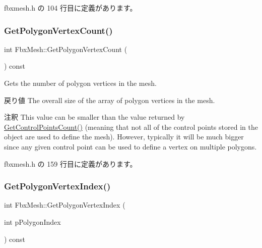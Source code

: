  fbxmesh.\+h の 104 行目に定義があります。

\mbox{\label{class_fbx_mesh_a46cdb95dfe5052564aeeba288474076e}} 
\subsubsection{\texorpdfstring{Get\+Polygon\+Vertex\+Count()}{GetPolygonVertexCount()}}
{\footnotesize\ttfamily int Fbx\+Mesh\+::\+Get\+Polygon\+Vertex\+Count (\begin{DoxyParamCaption}{ }\end{DoxyParamCaption}) const\hspace{0.3cm}{\ttfamily [inline]}}

Gets the number of polygon vertices in the mesh. \begin{DoxyReturn}{戻り値}
The overall size of the array of polygon vertices in the mesh. 
\end{DoxyReturn}
\begin{DoxyRemark}{注釈}
This value can be smaller than the value returned by \hyperlink{class_fbx_geometry_base_aa9f42ae6a958036722670143fabf3b17}{Get\+Control\+Points\+Count()} (meaning that not all of the control points stored in the object are used to define the mesh). However, typically it will be much bigger since any given control point can be used to define a vertex on multiple polygons. 
\end{DoxyRemark}


 fbxmesh.\+h の 159 行目に定義があります。

\mbox{\label{class_fbx_mesh_a942e182a7c27fa11464b9adb0c9cdc3b}} 
\subsubsection{\texorpdfstring{Get\+Polygon\+Vertex\+Index()}{GetPolygonVertexIndex()}}
{\footnotesize\ttfamily int Fbx\+Mesh\+::\+Get\+Polygon\+Vertex\+Index (\begin{DoxyParamCaption}\item[{int}]{p\+Polygon\+Index }\end{DoxyParamCaption}) const}

